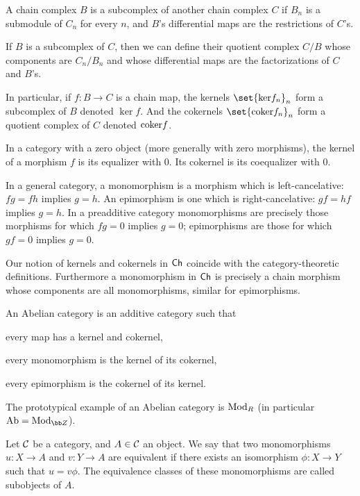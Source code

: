 \eprop

\bdefn

    A chain complex $B$ is a {\emphcolor subcomplex} of another chain complex $C$ if $B_n$ is a submodule of $C_n$ for every $n$, and $B$'s differential maps are the restrictions
    of $C$'s.

    If $B$ is a subcomplex of $C$, then we can define their {\emphcolor quotient complex} $C/B$ whose components are $C_n/B_n$ and whose differential maps are the factorizations of $C$ and $B$'s.

\edefn

In particular, if $f\colon B\to C$ is a chain map, the kernels $\set{\ker f_n}_n$ form a subcomplex of $B$ denoted $\ker f$.
And the cokernels $\set{\coker f_n}_n$ form a quotient complex of $C$ denoted ${\rm coker} f$.

\bdefn

    In a category with a zero object (more generally with zero morphisms), the {\emphcolor kernel} of a morphism $f$ is its equalizer with $0$.
    Its {\emphcolor cokernel} is its coequalizer with $0$.

    In a general category, a {\emphcolor monomorphism} is a morphism which is left-cancelative: $fg=fh$ implies $g=h$.
    An {\emphcolor epimorphism} is one which is right-cancelative: $gf=hf$ implies $g=h$.
    In a preadditive category monomorphisms are precisely those morphisms for which $fg=0$ implies $g=0$; epimorphisms are those for which $gf=0$ implies $g=0$.

\edefn

Our notion of kernels and cokernels in ${\sf Ch}$ coincide with the category-theoretic definitions.
Furthermore a monomorphism in ${\sf Ch}$ is precisely a chain morphism whose components are all monomorphisms, similar for epimorphisms.

\bdefn

    An {\emphcolor Abelian category} is an additive category such that
    \benum
        \item every map has a kernel and cokernel,
        \item every monomorphism is the kernel of its cokernel,
        \item every epimorphism is the cokernel of its kernel.
    \eenum

\edefn

The prototypical example of an Abelian category is ${\rm Mod}_R$ (in particular $\Ab=\Mod_\bZ$).

\bdefn

    Let ${{\cal C}}$ be a category, and $A\in{{\cal C}}$ an object.
    We say that two monomorphisms $u\colon X\to A$ and $v\colon Y\to A$ are equivalent if there exists an isomorphism $\phi\colon X\to Y$ such that $u=v\phi$.
    The equivalence classes of these monomorphisms are called {\emphcolor subobjects} of $A$.

